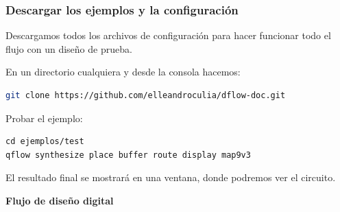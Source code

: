 \documentclass{beamer}
\begin{document}
\begin{frame}[fragile]
  \frametitle{Descargar los ejemplos y la configuración}
Descargamos todos los archivos de configuración para hacer funcionar todo el flujo con un diseño de prueba.

En un directorio cualquiera y desde la consola hacemos:
\begin{footnotesize}
  \begin{lstlisting}[language=bash]
git clone https://github.com/elleandroculia/dflow-doc.git
\end{lstlisting}
\end{footnotesize}

Probar el ejemplo:
\begin{footnotesize}
\begin{lstlisting}
cd ejemplos/test
qflow synthesize place buffer route display map9v3
\end{lstlisting}
\end{footnotesize}


El resultado final se mostrará en una ventana, donde podremos ver el circuito.

\end{frame}


\begin{frame}
\textbf{Flujo de diseño digital} 
   \begin{figure}[ht]
      \centering
    \end{figure}
\end{frame}
\end{document}
